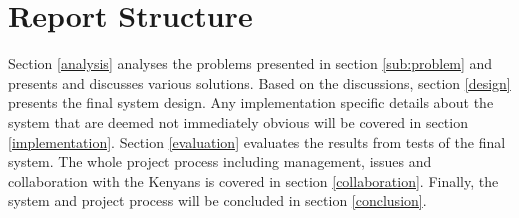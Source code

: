 \section{Report Structure}
Section \ref{analysis} analyses the problems presented in section \ref{sub:problem} and presents and discusses various solutions. Based on the discussions, section \ref{design} presents the final system design. Any implementation specific details about the system that are deemed not immediately obvious will be covered in section \ref{implementation}. Section \ref{evaluation} evaluates the results from tests of the final system. The whole project process including management, issues and collaboration with the Kenyans is covered in section \ref{collaboration}. Finally, the system and project process will be concluded in section \ref{conclusion}.